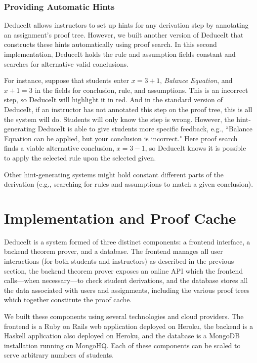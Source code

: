 \documentclass{sigchi}
\newcommand{\msb}[1]{\textbf{\textcolor{cyan}{Michael: #1}}}
\begin{document}
\subsubsection{Providing Automatic Hints}

DeduceIt allows instructors to set up hints for any derivation step by annotating an assignment's proof tree. However, we built another version of DeduceIt that constructs these hints automatically using proof search. In this second implementation, DeduceIt holds the rule and assumption fields constant and searches for alternative valid conclusions. 

For instance, suppose that students enter $x=3+1$, \textit{Balance Equation}, and $x+1=3$ in the fields for conclusion, rule, and assumptions. This is an incorrect step, so DeduceIt will highlight it in red. And in the standard version of DeduceIt, if an instructor has not annotated this step on the proof tree, this is all the system will do. Students will only know the step is wrong. However, the hint-generating DeduceIt is able to give students more specific feedback, e.g., ``Balance Equation can be applied, but your conclusion is incorrect." Here proof search finds a viable alternative conclusion, $x=3-1$, so DeduceIt knows it is possible to apply the selected rule upon the selected given.

Other hint-generating systems might hold constant different parts of the derivation (e.g., searching for rules and assumptions to match a given conclusion).

\section{Implementation and Proof Cache}


DeduceIt is a system formed of three distinct components: a frontend interface, a backend theorem prover, and a database. The frontend manages all user interactions (for both students and instructors) as described in the previous section, the backend theorem prover exposes an online API which the frontend calls---when necessary---to check student derivations, and the database stores all the data associated with users and assignments, including the various proof trees which together constitute the proof cache. %

We built these components using several technologies and cloud providers. The frontend is a Ruby on Rails web application deployed on Heroku, the backend is a Haskell application also deployed on Heroku, and the database is a MongoDB installation running on MongoHQ. Each of these components can be scaled to serve arbitrary numbers of students.
\end{document}
